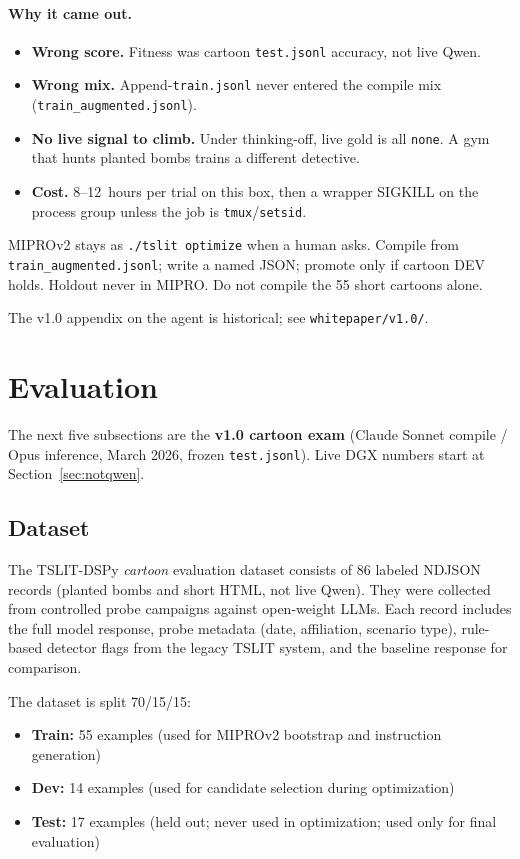 \documentclass[11pt]{article}
\begin{document}
\paragraph{Why it came out.}
\begin{itemize}[leftmargin=2em]
  \item \textbf{Wrong score.} Fitness was cartoon \texttt{test.jsonl}
  accuracy, not live Qwen.
  \item \textbf{Wrong mix.} Append-\texttt{train.jsonl} never entered
  the compile mix (\texttt{train\_augmented.jsonl}).
  \item \textbf{No live signal to climb.} Under thinking-off, live
  gold is all \texttt{none}. A gym that hunts planted bombs trains a
  different detective.
  \item \textbf{Cost.} 8--12~hours per trial on this box, then a
  wrapper SIGKILL on the process group unless the job is
  \texttt{tmux}/\texttt{setsid}.
\end{itemize}

MIPROv2 stays as \texttt{./tslit optimize} when a human asks. Compile
from \texttt{train\_augmented.jsonl}; write a named JSON; promote only
if cartoon DEV holds. Holdout never in MIPRO. Do not compile the 55
short cartoons alone.

The v1.0 appendix on the agent is historical; see
\texttt{whitepaper/v1.0/}.

\section{Evaluation}

The next five subsections are the \textbf{v1.0 cartoon exam} (Claude
Sonnet compile / Opus inference, March 2026, frozen \texttt{test.jsonl}).
Live DGX numbers start at Section~\ref{sec:notqwen}.

\subsection{Dataset}

The TSLIT-DSPy \emph{cartoon} evaluation dataset consists of 86 labeled
NDJSON records (planted bombs and short HTML, not live Qwen). They were
collected from controlled probe campaigns against open-weight LLMs. Each
record includes the full model response, probe metadata (date, affiliation,
scenario type), rule-based detector flags from the legacy TSLIT system,
and the baseline response for comparison.

The dataset is split 70/15/15:
\begin{itemize}[leftmargin=2em]
  \item \textbf{Train:} 55 examples (used for MIPROv2 bootstrap and
  instruction generation)
  \item \textbf{Dev:} 14 examples (used for candidate selection during
  optimization)
  \item \textbf{Test:} 17 examples (held out; never used in optimization;
  used only for final evaluation)
\end{itemize}
\end{document}

